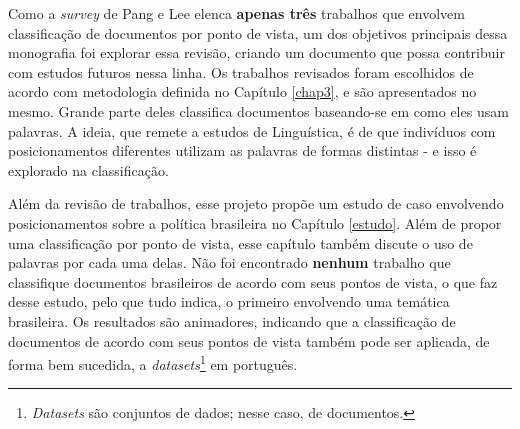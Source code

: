 Como a \emph{survey} de Pang e Lee elenca \textbf{apenas três} trabalhos que envolvem classificação de documentos por ponto de vista, um dos objetivos principais dessa monografia foi explorar essa revisão, criando um documento que possa contribuir com estudos futuros nessa linha. Os trabalhos revisados foram escolhidos de acordo com metodologia definida no Capítulo \ref{chap3}, e são apresentados no mesmo. Grande parte deles classifica documentos baseando-se em como eles usam palavras. A ideia, que remete a estudos de Linguística, é de que indivíduos com posicionamentos diferentes utilizam as palavras de formas distintas  \cite{teubert} - e isso é explorado na classificação. 


Além da revisão de trabalhos, esse projeto propõe um estudo de caso envolvendo posicionamentos sobre a política brasileira no Capítulo \ref{estudo}. Além de propor uma classificação por ponto de vista, esse capítulo também discute o uso de palavras por cada uma delas. Não foi encontrado \textbf{nenhum} trabalho que classifique documentos brasileiros de acordo com seus pontos de vista, o que faz desse estudo, pelo que tudo indica, o primeiro envolvendo uma temática brasileira. Os resultados são animadores, indicando que a classificação de documentos de acordo com seus pontos de vista também pode ser aplicada, de forma bem sucedida, a \emph{datasets}\footnote{\emph{Datasets} são conjuntos de dados; nesse caso, de documentos.} em português.


